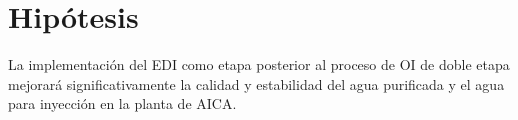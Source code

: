 \section{ Hipótesis}
La implementación del EDI como etapa posterior al proceso de OI de doble etapa mejorará significativamente la calidad y estabilidad del agua purificada y el agua para inyección en la planta de AICA.